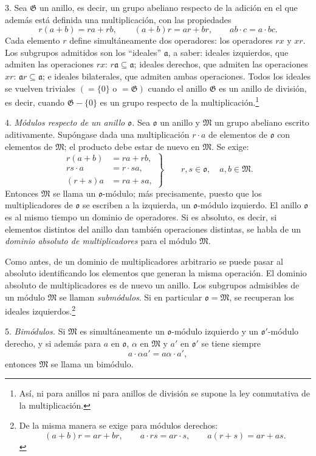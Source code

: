 \documentclass[11pt]{article}
\providecommand{\mG}{\mathfrak{G}}
\providecommand{\mM}{\mathfrak{M}}
\providecommand{\mo}{\mathfrak{o}}
\begin{document}
3. Sea $\mG$ un anillo, es decir, un grupo abeliano respecto de la adición en el que además está definida una multiplicación, con las propiedades
\[
        r(a+b)=ra+rb,\qquad (a+b)r=ar+br,\qquad ab\cdot c=a\cdot bc.
\]
Cada elemento $r$ define simultáneamente dos operadores: los operadores $rx$ y $xr$. Los subgrupos admitidos son los ``ideales'' $\mathfrak a$, a saber: ideales izquierdos, que admiten las operaciones $rx$: $r\mathfrak a\subseteq\mathfrak a$; ideales derechos, que admiten las operaciones $xr$: $\mathfrak a r\subseteq\mathfrak a$; e ideales bilaterales, que admiten ambas operaciones. Todos los ideales se vuelven triviales $(=\{0\}\text{ o }=\mG)$ cuando el anillo $\mG$ es un anillo de división, es decir, cuando $\mG-\{0\}$ es un grupo respecto de la multiplicación.\footnote{Así, ni para anillos ni para anillos de división se supone la ley conmutativa de la multiplicación.}

4. \emph{Módulos respecto de un anillo $\mo$.} Sea $\mo$ un anillo y $\mM$ un grupo abeliano escrito aditivamente. Supóngase dada una multiplicación $r\cdot a$ de elementos de $\mo$ con elementos de $\mM$; el producto debe estar de nuevo en $\mM$. Se exige:
\[
\left.
\begin{aligned}
 r(a+b)&=ra+rb,\\
 rs\cdot a&=r\cdot sa,\\
 (r+s)a&=ra+sa,
\end{aligned}
\right\}\qquad r,s\in\mo,\quad a,b\in\mM.
\]
Entonces $\mM$ se llama un $\mo$-módulo; más precisamente, puesto que los multiplicadores de $\mo$ se escriben a la izquierda, un $\mo$-módulo izquierdo. El anillo $\mo$ es al mismo tiempo un dominio de operadores. Si es absoluto, es decir, si elementos distintos del anillo dan también operaciones distintas, se habla de un \emph{dominio absoluto de multiplicadores} para el módulo $\mM$.

Como antes, de un dominio de multiplicadores arbitrario se puede pasar al absoluto identificando los elementos que generan la misma operación. El dominio absoluto de multiplicadores es de nuevo un anillo. Los subgrupos admisibles de un módulo $\mM$ se llaman \emph{submódulos}. Si en particular $\mo=\mM$, se recuperan los ideales izquierdos.\footnote{De la misma manera se exige para módulos derechos:
\[
(a+b)r=ar+br,\qquad a\cdot rs=ar\cdot s,\qquad a(r+s)=ar+as.
\]}

5. \emph{Bimódulos.} Si $\mM$ es simultáneamente un $\mo$-módulo izquierdo y un $\mo'$-módulo derecho, y si además para $a$ en $\mo$, $\alpha$ en $\mM$ y $a'$ en $\mo'$ se tiene siempre
\[
        a\cdot\alpha a'=a\alpha\cdot a',
\]
entonces $\mM$ se llama un bimódulo.
\end{document}
